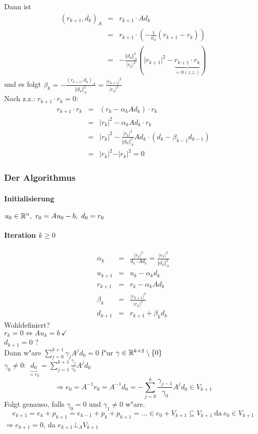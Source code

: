 \documentclass{scrartcl}
\begin{document}
Dann ist 
\begin{eqnarray*}
(r_{k+1}, d_k)_A & = & r_{k+1} \cdot A d_k \\
& = & r_{k+1} \cdot \left( - \frac{1}{\alpha_k} (r_{k+1} - r_k) \right) \\
& = & - \frac{ \Vert d_k \Vert_A^2}{ \vert r_k \vert^2} ( \vert r_{k+1} \vert ^2 - \underbrace{r_{k+1}\cdot r_k }_{=0 (z.z.)} ) 
\end{eqnarray*}
und es folgt $\beta_k = - \frac{ (r_{k+1}, d_k)_A}{ \Vert d_k \Vert_A^2} = \frac{ \vert r_{k+1} \vert^2 }{ \vert r_k \vert^2}$ \\
Noch z.z.: $r_{k+1} \cdot r_k = 0$:
\begin{eqnarray*}
r_{k+1} \cdot r_k & = & (r_k - \alpha_k A d_k)  \cdot r_k \\
& =& \vert r_k \vert^2 - \alpha_k A d_k \cdot r_k \\
& = & \vert r_k \vert ^2 - \frac{\vert r_k \vert^2 }{\Vert d_k \Vert_A^2} A d_k \cdot (d_k - \beta_{k-1} d_{k-1} ) \\
& = & \vert r_k \vert ^2 - \vert r_k \vert^2 = 0
\end{eqnarray*}

\subsubsection*{Der Algorithmus}
\paragraph*{Initialisierung}
$u_0 \in \mathbb{R}^n, \ r_0 = A u_0 - b, \ d_0 = r_0$
\paragraph*{Iteration $k \geq 0$}
\begin{eqnarray*}
\alpha_k & = & \frac{\vert r_k \vert^2}{d_k \cdot A d_k} = \frac{ \vert r_k \vert^2}{\Vert d_k \Vert^2_A} \\
u_{k+1} & = & u_k - \alpha_k d_k \\
r_{k+1} & = & r_k - \alpha_k A d_k \\
\beta_k & = & \frac{ \vert r_{k+1} \vert^2 }{\vert r_k \vert^2 } \\
d_{k+1} & = & r_{k+1} + \beta_k d_k
\end{eqnarray*}
Wohldefiniert? \\
$r_k = 0 \Leftrightarrow A u_k = b \ \checkmark$ \\
$d_{k+1} = 0$ ? \\
Dann w"are $\sum\limits_{j=0}^{k+1} \gamma_j A^j d_0 = 0$ f"ur $\gamma \in \mathbb{R}^{k+2} \setminus \{ 0 \}$ \\
$\gamma_0 \neq 0$: $\underbrace{d_0}_{=r_0} = \sum\limits_{j=1}^{k+1} \frac{\gamma_j}{\gamma_0} A^j d_0$ 
$$\Rightarrow e_0 = A^{-1} r_0 = A^{-1} d_0 = - \sum\limits_{j=0}^k \frac{\gamma_{j-1}}{\gamma_0} A^j d_0 \in V_{k+1}$$
Folgt genauso, falls $\gamma_0 = 0$ und $\gamma_1 \neq 0$ w"are. 
$$e_{k+1} = e_k + p_{k+1} = e_{k-1} + p_k + p_{k+1} = \ldots \in e_0 + V_{k+1} \subseteq V_{k+1} \ \mathrm{da \ } e_0 \in V_{k+1}$$
$\Rightarrow e_{k+1} = 0$, da $e_{k+1} \bot_A V_{k+1}$
\end{document}

